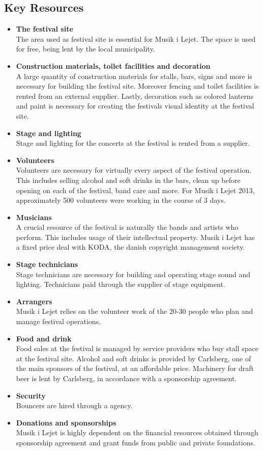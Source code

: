 \subsection{Key Resources} %
\label{sub:key_resources}
\begin{itemize}
(møde med kristian og stakke)
	\item \textbf{The festival site}\\
	The area used as festival site is essential for Musik i Lejet. The space is used for free, being lent by the local municipality.
	\item \textbf{Construction materials, toilet facilities and decoration}\\
	A large quantity of construction materials for stalls, bars, signs and more is necessary for building the festival site. Moreover fencing and toilet facilities is rented from an external supplier. Lastly, decoration such as colored lanterns and paint is necessary for creating the festivals visual identity at the festival site.
	\item \textbf{Stage and lighting}\\
	Stage and lighting for the concerts at the festival is rented from a supplier.
	\item \textbf{Volunteers}\\
	Volunteers are necessary for virtually every aspect of the festival operation. This includes selling alcohol and soft drinks in the bars, clean up before opening on each of the festival, band care and more. For Musik i Lejet 2013, approximately 500 volunteers were working in the course of 3 days.
	\item \textbf{Musicians}\\
	A crucial resource of the festival is naturally the bands and artists who perform. This includes usage of their intellectual property. Musik i Lejet has a fixed price deal with KODA, the danish copyright management society.
	\item \textbf{Stage technicians}\\
	Stage technicians are necessary for building and operating stage sound and lighting. Technicians paid through the supplier of stage equipment.
	\item \textbf{Arrangers}\\
	Musik i Lejet relies on the volunteer work of the 20-30 people who plan and manage festival operations.
	\item \textbf{Food and drink}\\
	Food sales at the festival is managed by service providers who buy stall space at the festival site. Alcohol and soft drinks is provided by Carlsberg, one of the main sponsors of the festival, at an affordable price. Machinery for draft beer is lent by Carlsberg, in accordance with a sponsorship agreement.
	\item \textbf{Security}\\
	Bouncers are hired through a agency.
	\item \textbf{Donations and sponsorships}\\
	Musik i Lejet is highly dependent on the financial resources obtained through sponsorship agreement and grant funds from public and private foundations.
\end{itemize}

